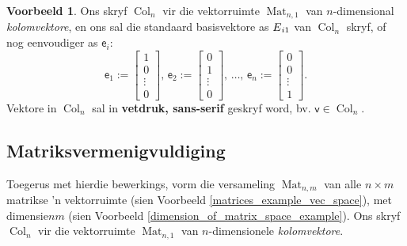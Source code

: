 \documentclass[a4paper,11pt]{book}
\theoremstyle{definition}
\newtheorem{example_environment}{Voorbeeld}[chapter]
\newcommand{\mat}[1]{\mathsf{#1}}
\newcommand{\col}[1]{\bm{\mat{#1}}}
\newenvironment{example}
	{
		\begin{oframed}
		\begin{example_environment}
	}
	{
		\end{example_environment}
		\end{oframed}
	}
\DeclareMathOperator{\Mat}{Mat}
\DeclareMathOperator{\Col}{Col}
\begin{document}
\begin{appendices}
\begin{example} Ons skryf $\Col_n$ vir die vektorruimte $\Mat_{n,1}$ van
	$n$-dimensional \emph{kolomvektore}, en ons sal die standaard
	basisvektore as ${\mathbf \mat{E}}_{i1}$ van $\Col_n$ skryf, of nog
	eenvoudiger as $\col{e}_i$:
	\[
		\col{e}_1 := \left[ 
		\begin{array}{c}
			1 \\
			0 \\ 
			\vdots \\
			0 
		\end{array} 
		\right], \, \col{e}_2 := \left[ 
		\begin{array}{c} 
			0 \\
			1 \\
			\vdots \\
			0 
		\end{array} 
		\right], \, \ldots, \, \col{e}_n := \left[ 
		\begin{array}{c} 
			0 \\ 
			0 \\ 
			\vdots \\ 
			1 
		\end{array} 
		\right] . 
	\]
	Vektore in $\Col_n$ sal in \textbf{\textsf{vetdruk, sans-serif}}
	geskryf word, bv. $\col{v} \in \Col_n$.
\end{example}

\subsection{Matriksvermenigvuldiging}

Toegerus met hierdie bewerkings, vorm die versameling $\Mat_{n, m}$ van
alle $n \times m$ matrikse 'n vektorruimte (sien Voorbeeld
\ref{matrices_example_vec_space}), met dimensie$nm$ (sien Voorbeeld
\ref{dimension_of_matrix_space_example}). Ons skryf $\Col_n$ vir die
vektorruimte $\Mat_{n,1}$ van $n$-dimensionele \emph{kolomvektore}.


\end{appendices}
\end{document}
